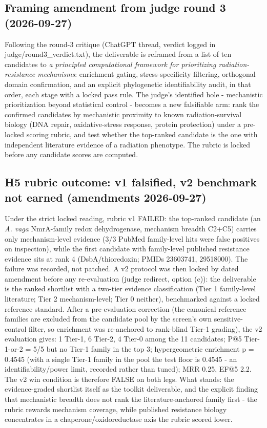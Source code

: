 \documentclass[12pt,a4paper]{article}
\begin{document}
\subsection{Framing amendment from judge round 3 (2026-09-27)}
Following the round-3 critique (ChatGPT thread, verdict logged in judge/round3\_verdict.txt), the deliverable is reframed from a list of ten candidates to \emph{a principled computational framework for prioritizing radiation-resistance mechanisms}: enrichment gating, stress-specificity filtering, orthogonal domain confirmation, and an explicit phylogenetic identifiability audit, in that order, each stage with a locked pass rule. The judge's identified hole - mechanistic prioritization beyond statistical control - becomes a new falsifiable arm: rank the confirmed candidates by mechanistic proximity to known radiation-survival biology (DNA repair, oxidative-stress response, protein protection) under a pre-locked scoring rubric, and test whether the top-ranked candidate is the one with independent literature evidence of a radiation phenotype. The rubric is locked before any candidate scores are computed.
\subsection{H5 rubric outcome: v1 falsified, v2 benchmark not earned (amendments 2026-09-27)}
Under the strict locked reading, rubric v1 FAILED: the top-ranked candidate (an \emph{A. vaga} NmrA-family redox dehydrogenase, mechanism breadth C2+C5) carries only mechanism-level evidence (3/3 PubMed family-level hits were false positives on inspection), while the first candidate with family-level published resistance evidence sits at rank 4 (DsbA/thioredoxin; PMIDs 23603741, 29518000). The failure was recorded, not patched. A v2 protocol was then locked by dated amendment before any re-evaluation (judge redirect, option (c)): the deliverable is the ranked shortlist with a two-tier evidence classification (Tier 1 family-level literature; Tier 2 mechanism-level; Tier 0 neither), benchmarked against a locked reference standard. After a pre-evaluation correction (the canonical reference families are excluded from the candidate pool by the screen's own sensitive-control filter, so enrichment was re-anchored to rank-blind Tier-1 grading), the v2 evaluation gives: 1 Tier-1, 6 Tier-2, 4 Tier-0 among the 11 candidates; P@5 Tier-1-or-2 = 5/5 but no Tier-1 family in the top 3; hypergeometric enrichment p = 0.4545 (with a single Tier-1 family in the pool the test floor is 0.4545 - an identifiability/power limit, recorded rather than tuned); MRR 0.25, EF@5 2.2. The v2 win condition is therefore FALSE on both legs. What stands: the evidence-graded shortlist itself as the toolkit deliverable, and the explicit finding that mechanistic breadth does not rank the literature-anchored family first - the rubric rewards mechanism coverage, while published resistance biology concentrates in a chaperone/oxidoreductase axis the rubric scored lower.
\end{document}

